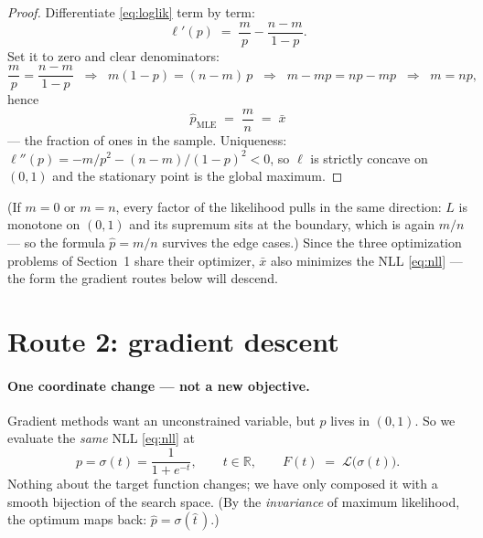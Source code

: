 \documentclass[11pt]{article}
\newcommand{\sigmoid}{\sigma}
\newcommand{\xbar}{\bar{x}}
\begin{document}
\begin{proof}
Differentiate \eqref{eq:loglik} term by term:
\begin{equation*}
  \ell'(p) \;=\; \frac{m}{p} - \frac{n-m}{1-p}.
\end{equation*}
Set it to zero and clear denominators:
\begin{equation*}
  \frac{m}{p} = \frac{n-m}{1-p}
  \;\;\Longrightarrow\;\;
  m(1-p) = (n-m)\,p
  \;\;\Longrightarrow\;\;
  m - mp = np - mp
  \;\;\Longrightarrow\;\;
  m = np,
\end{equation*}
hence
\begin{equation}
  \boxed{\;\hat{p}_{\mathrm{MLE}} \;=\; \frac{m}{n} \;=\; \xbar\;}
  \label{eq:phat}
\end{equation}
--- the fraction of ones in the sample. Uniqueness:
$\ell''(p) = -m/p^{2} - (n-m)/(1-p)^{2} < 0$, so $\ell$ is strictly concave
on $(0,1)$ and the stationary point is the global maximum.
\end{proof}

(If $m = 0$ or $m = n$, every factor of the likelihood pulls in the same
direction: $L$ is monotone on $(0,1)$ and its supremum sits at the
boundary, which is again $m/n$ --- so the formula $\hat p = m/n$ survives
the edge cases.) Since the three optimization problems of Section~1 share
their optimizer, $\xbar$ also minimizes the NLL \eqref{eq:nll} --- the
form the gradient routes below will descend.

\section{Route 2: gradient descent}

\paragraph{One coordinate change --- not a new objective.}
Gradient methods want an unconstrained variable, but $p$ lives in $(0,1)$.
So we evaluate the \emph{same} NLL \eqref{eq:nll} at
\begin{equation}
  p = \sigmoid(t) = \frac{1}{1+e^{-t}}, \qquad t \in \mathbb{R},
  \qquad
  F(t) \;=\; \mathcal{L}\bigl(\sigmoid(t)\bigr).
  \label{eq:reparam}
\end{equation}
Nothing about the target function changes; we have only composed it with a
smooth bijection of the search space. (By the \emph{invariance} of maximum
likelihood, the optimum maps back: $\hat p = \sigmoid(\hat t\,)$.)
\end{document}
